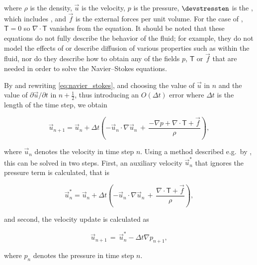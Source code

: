 where $\rho$ is the density, $\vec{u}$ is the velocity, $p$ is the pressure, $\devstressten$ is the , which includes , and $\vec{f}$ is the external forces per unit volume. For the case of , ${\boldsymbol{\mathsf{T}} = 0}$ so ${\nabla\cdot\boldsymbol{\mathsf{T}}}$ vanishes from the equation. It should be noted that these equations do not fully describe the behavior of the fluid; for example, they do not model the effects of  or describe diffusion of various properties such as \temperature within the fluid, nor do they describe how to obtain any of the fields $p$, $\boldsymbol{\mathsf{T}}$ or $\vec{f}$ that are needed in order to solve the Navier--Stokes equations.

By  and rewriting \eqref{eq:navier_stokes}, and choosing the value of $\vec{u}$ in \timestep $n$ and the value of $\partial\vec{u}/\partial t$ in \timestep $n+\frac{1}{2}$, thus introducing an $O(\Delta t)$ error where $\Delta t$ is the length of the time step, we obtain

\begin{equation} \label{eq:navier_stokes_time_discretized}
\vec{u}_{n+1}  = \vec{u}_{n} + \Delta t\left(-\vec{u}_{n}\cdot\nabla\vec{u}_{n} \,+\, \frac{-\nabla p + \nabla\cdot\boldsymbol{\mathsf{T}} + \vec{f}}{\rho}\right),
\end{equation}

where $\vec{u}_{n}$ denotes the velocity in time step $n$. Using a method described e.g.\ by \citet{Losasso2004}, this \PDE can be solved in two steps. First, an auxiliary velocity $\vec{u}^*_n$ that ignores the pressure term is calculated, that is

\begin{equation} \label{eq:auxiliary_velocity}
\vec{u}^*_n  = \vec{u}_{n} + \Delta t\left(-\vec{u}_{n}\cdot\nabla\vec{u}_{n} \,+\, \frac{\nabla\cdot\boldsymbol{\mathsf{T}} + \vec{f}}{\rho}\right),
\end{equation}

and second, the velocity update is calculated as

\begin{equation} \label{eq:velocity_update}
\vec{u}_{n+1} \,=\, \vec{u}^*_n - \Delta t\nabla p_{n+1},
\end{equation}

where $p_n$ denotes the pressure in time step $n$.

